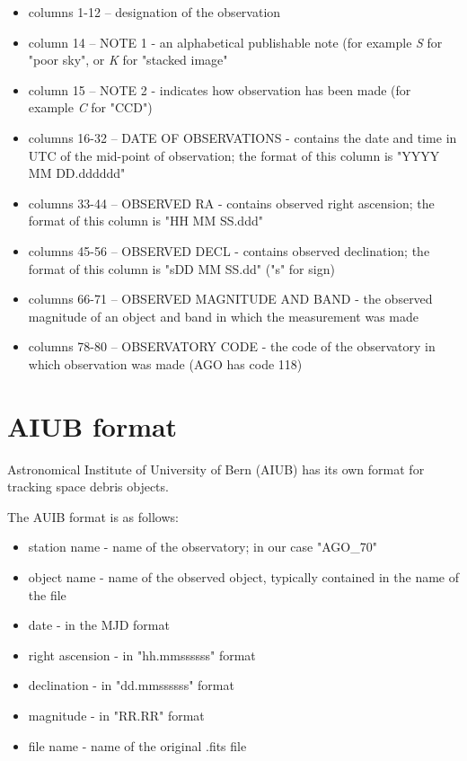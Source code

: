 	\begin{itemize}
		\item columns 1-12 -- designation of the observation
		\item column 14 -- NOTE 1 - an alphabetical publishable note (for example \emph{S} for "poor sky", or \emph{K} for "stacked image"
		\item column 15 -- NOTE 2 - indicates how observation has been made (for example \emph{C} for "CCD")
		\item columns 16-32 -- DATE OF OBSERVATIONS - contains the date and time in UTC of the mid-point of observation; the format of this column is "YYYY MM DD.dddddd"
		\item columns 33-44 -- OBSERVED RA - contains observed right ascension; the format of this column is "HH MM SS.ddd"
		\item columns 45-56 -- OBSERVED DECL - contains observed declination; the format of this column is "sDD MM SS.dd" ("s" for sign)
		\item columns 66-71 -- OBSERVED MAGNITUDE AND BAND - the observed magnitude of an object and band in which the measurement was made
		\item columns 78-80 -- OBSERVATORY CODE - the code of the observatory in which observation was made (AGO has code 118)
	\end{itemize}
	
\section{AIUB format}\label{sec:auib}

	Astronomical Institute of University of Bern (AIUB) has its own format for tracking space debris objects.
	
	The AUIB format is as follows:
	
\begin{itemize}
	\item station name - name of the observatory; in our case "AGO\_70"
	\item object name - name of the observed object, typically contained in the name of the file
	\item date - in the MJD format
	\item right ascension - in "hh.mmssssss" format
	\item declination - in "dd.mmssssss" format
	\item magnitude - in "RR.RR" format
	\item file name - name of the original .fits file
\end{itemize}

